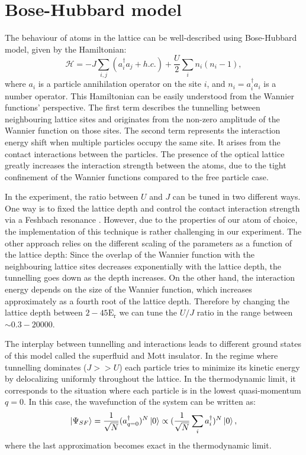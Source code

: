 \section{Bose-Hubbard model}
The behaviour of atoms in the lattice can be well-described using Bose-Hubbard model, given by the Hamiltonian:
\begin{equation}
\mathcal{H} = -J\sum_{i,j} (a_i^\dagger a_j + h.c.) + \frac{U}{2} \sum_i n_i(n_i-1),
\end{equation}
where $a_i$ is a particle annihilation operator on the site $i$, and $n_i = a_i^\dagger a_i$ is a number operator. This Hamiltonian can be easily understood from the Wannier functions' perspective. The first term describes the tunnelling between neighbouring lattice sites and originates from the non-zero amplitude of the Wannier function on those sites. The second term represents the interaction energy shift when multiple particles occupy the same site. It arises from the contact interactions between the particles. The presence of the optical lattice greatly increases the interaction strength between the atoms, due to the tight confinement of the Wannier functions compared to the free particle case.

In the experiment, the ratio between $U$ and $J$ can be tuned in two different ways. One way is to fixed the lattice depth and control the contact interaction strength via a Feshbach resonance \cite{Chin2010}. However, due to the properties of our atom of choice, the implementation of this technique is rather challenging in our experiment. The other approach relies on the different scaling of the parameters as a function of the lattice depth: Since the overlap of the Wannier function with the neighbouring lattice sites decreases exponentially with the lattice depth, the tunnelling goes down as the depth increases. On the other hand, the interaction energy depends on the size of the Wannier function, which increases approximately as a fourth root of the lattice depth. Therefore by changing the lattice depth between $2-45 \mathrm{E_r}$ we can tune the $U/J$ ratio in the range between $\sim 0.3-20000$.

The interplay between tunnelling and interactions leads to different ground states of this model called the superfluid and Mott insulator. In the regime where tunnelling dominates ($J>>U$) each particle tries to minimize its kinetic energy by delocalizing uniformly throughout the lattice. In the thermodynamic limit, it corresponds to the situation where each particle is in the lowest quasi-momentum $q=0$. In this case, the wavefunction of the system can be written as:
\begin{equation}
\left|\Psi_{SF}\right\rangle = \frac{1}{\sqrt{N}}(a_{q=0}^\dagger)^N\left|0\right\rangle \propto (\frac{1}{\sqrt{N}}\sum_i a_i^\dagger)^N\left|0\right\rangle,
\end{equation}
where the last approximation becomes exact in the thermodynamic limit.


